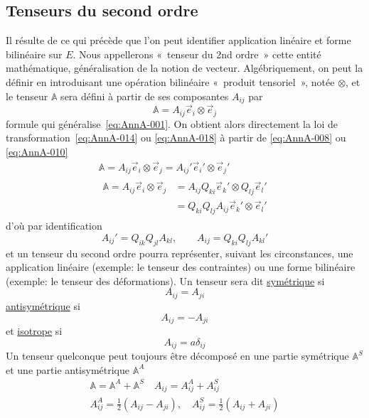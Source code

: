 \subsection{Tenseurs du second ordre}
Il résulte de ce qui précède que l'on peut identifier application linéaire et forme bilinéaire sur $E$.
Nous appellerons «~tenseur du 2nd ordre~» cette entité mathématique, généralisation de la notion de vecteur.
Algébriquement, on peut la définir en introduisant une opération bilinéaire «~produit tensoriel~», notée $\otimes$, et le tenseur $\mathbb{A}$ sera défini à partir de ses composantes $A_{ij}$ par
\begin{equation}
    \mathbb{A} = A_{ij} \vec{e}_i \otimes \vec{e}_j
    \label{eq:AnnA-019}
\end{equation}
formule qui généralise~\eqref{eq:AnnA-001}.
On obtient alors directement la loi de transformation~\eqref{eq:AnnA-014} ou \eqref{eq:AnnA-018} à partir de \eqref{eq:AnnA-008} ou \eqref{eq:AnnA-010}
\begin{gather*}
    \mathbb{A} = A_{ij} \vec{e}_i \otimes \vec{e}_j = A_{ij}' \vec{e}_i{}' \otimes \vec{e}_j{}'\\
    \begin{align*}
    \mathbb{A} = A_{ij} \vec{e}_i \otimes \vec{e}_j &= A_{ij} Q_{ki} \vec{e}_k{}' \otimes Q_{lj} \vec{e}_l{}'\\
    &= Q_{ki} Q_{lj} A_{ij} \vec{e}_k{}' \otimes \vec{e}_l{}'
    \end{align*}
\end{gather*}
d'où par identification
\begin{equation}
    A_{ij}' = Q_{ik} Q_{jl} A_{kl}, \qquad A_{ij} = Q_{ki} Q_{lj} A_{kl}'
    \label{eq:AnnA-020}
\end{equation}
et un tenseur du second ordre pourra représenter, suivant les circonstances, une application linéaire (exemple: le tenseur des contraintes) ou une forme bilinéaire (exemple: le tenseur des déformations).
Un tenseur sera dit \underline{symétrique} si
\begin{equation}
    A_{ij} = A_{ji}
    \label{eq:AnnA-021}
\end{equation}
\underline{antisymétrique} si
\begin{equation}
    A_{ij} = - A_{ji}
    \label{eq:AnnA-022}
\end{equation}
et \underline{isotrope} si
\begin{equation}
    A_{ij} = a \delta_{ij}
    \label{eq:AnnA-0123}
\end{equation}
Un tenseur quelconque peut toujours être décomposé en une partie symétrique $\mathbb{A}^S$ et une partie antisymétrique $\mathbb{A}^A$
\begin{equation}
    \begin{split}
        \mathbb{A} = \mathbb{A}^A + \mathbb{A}^S \quad A_{ij} = A_{ij}^A + A_{ij}^S \\
        A_{ij}^A = \frac{1}{2} \left( A_{ij} - A_{ji} \right), \quad A_{ij}^S = \frac{1}{2} \left( A_{ij} + A_{ji} \right)
    \end{split}
    \label{eq:AnnA-024}
\end{equation}
